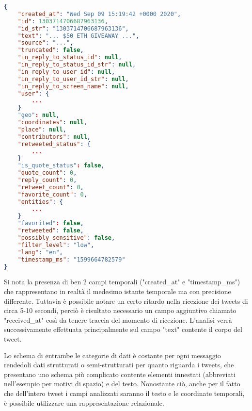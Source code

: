 \begin{lstlisting}[language=json,firstnumber=1]
{
    "created_at": "Wed Sep 09 15:19:42 +0000 2020",
    "id": 1303714706687963136,
    "id_str": "1303714706687963136",
    "text": "... $50 ETH GIVEAWAY ...",
    "source": "...",
    "truncated": false,
    "in_reply_to_status_id": null,
    "in_reply_to_status_id_str": null,
    "in_reply_to_user_id": null,
    "in_reply_to_user_id_str": null,
    "in_reply_to_screen_name": null,
    "user": {
        ...
    }
    "geo": null,
    "coordinates": null,
    "place": null,
    "contributors": null,
    "retweeted_status": {
        ...
    }
    "is_quote_status": false,
    "quote_count": 0,
    "reply_count": 0,
    "retweet_count": 0,
    "favorite_count": 0,
    "entities": {
        ...
    }
    "favorited": false,
    "retweeted": false,
    "possibly_sensitive": false,
    "filter_level": "low",
    "lang": "en",
    "timestamp_ms": "1599664782579"
}
\end{lstlisting}
%
Si nota la presenza di ben 2 campi temporali ("created\_at" e "timestamp\_ms") che
rappresentano in realtà il medesimo istante temporale ma con precisione differente.
Tuttavia è possibile notare un certo ritardo nella ricezione dei tweets di circa 5-10
secondi, perciò è risultato necessario un campo aggiuntivo chiamato "received\_at" così
da tenere traccia del momento di ricezione.
L'analisi verrà successivamente effettuata principalmente sul campo "text" contente il
corpo del tweet.

Lo schema di entrambe le categorie di dati è costante per ogni messaggio rendedoli dati
strutturati o semi-strutturati per quanto riguarda i tweets, che presentano uno schema più complicato contente
elementi innestati (abbreviati nell'esempio per motivi di spazio) e del testo.
Nonostante ciò, anche per il fatto che dell'intero tweet i campi analizzati saranno il testo
e le coordinate temporali, è possibile utilizzare una rappresentazione relazionale.


